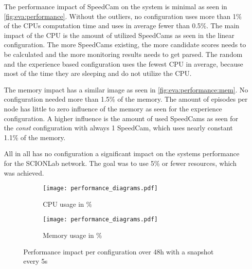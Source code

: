\documentclass[thesis.tex]{subfiles}
\begin{document}
The performance impact of SpeedCam on the system is minimal as seen in \autoref{fig:eva:performance}. Without the outliers, no configuration uses more than 1\% of the CPUs computation time and uses in average fewer than 0.5\%. The main impact of the CPU is the amount of utilized SpeedCams as seen in the linear configuration. The more SpeedCams existing, the more candidate scores needs to be calculated and the more monitoring results needs to get parsed. The random and the experience based configuration uses the fewest CPU in average, because most of the time they are sleeping and do not utilize the CPU.

The memory impact has a similar image as seen in \autoref{fig:eva:performance:mem}. No configuration needed more than 1.5\% of the memory. The amount of episodes per node has little to zero influence of the memory as seen for the experience configuration. A higher influence is the amount of used SpeedCams as seen for the \textit{const} configuration with always 1 SpeedCam, which uses nearly constant 1.1\% of the memory.

All in all has no configuration a significant impact on the systems performance for the SCIONLab network. The goal was to use 5\% or fewer resources, which was achieved.
\begin{figure}
	\centering
	\begin{subfigure}{0.8\linewidth}
		\centering
		\texttt{[image: performance\_diagrams.pdf]}
		\caption{CPU usage in \%}
		\label{fig:eva:performance:cpu}
	\end{subfigure}
	\hfill
	\begin{subfigure}{0.8\linewidth}
		\centering
		\texttt{[image: performance\_diagrams.pdf]}
		\caption{Memory usage in \%}
		\label{fig:eva:performance:mem}
	\end{subfigure}
	\caption{Performance impact per configuration over 48h with a snapshot every 5s}
	\label{fig:eva:performance}
\end{figure}

\subfilebib %
\end{document}
